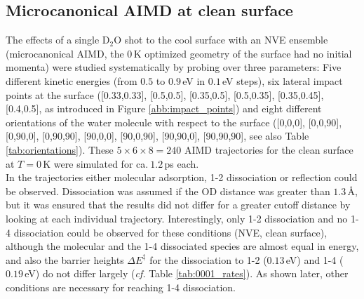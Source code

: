 \documentclass[11pt,DIV=13,BCOR=5mm,a4paper,headinclude]{scrbook}
\begin{document}
\subsection{Microcanonical AIMD at clean surface}\label{sec:mic_clean}
The effects of a single D$_2$O shot to the cool surface with an NVE ensemble (microcanonical AIMD, the $0\,$K optimized geometry of the surface had no initial momenta) were studied systematically by probing over three parameters: Five different kinetic energies (from $0.5$ to $0.9\,$eV in $0.1\,$eV steps), six lateral impact points at the surface ([0.33,0.33], [0.5,0.5], [0.35,0.5], [0.5,0.35], [0.35,0.45], [0.4,0.5], as introduced in Figure \ref{abb:impact_points}) and eight different orientations of the water molecule with respect to the surface ([0,0,0], [0,0,90], [0,90,0], [0,90,90], [90,0,0], [90,0,90], [90,90,0], [90,90,90], see also Table \ref{tab:orientations}).
These $5\times 6\times 8=240$ AIMD trajectories for the clean surface at $T=0\,$K were simulated for ca.$~1.2\,$ps each.
\\
In the trajectories  either molecular adsorption, 1-2 dissociation or reflection could be observed.
Dissociation was assumed if the OD distance was greater than $1.3\,$\AA{}, but it was ensured that the results did not differ for a greater cutoff distance by looking at each individual trajectory.
Interestingly, only 1-2 dissociation and no 1-4 dissociation could be observed for these conditions (NVE, clean surface), although the molecular and the 1-4 dissociated species are almost equal in energy, and also the barrier heights $\Delta E^\ddagger$ for the dissociation to 1-2 ($0.13\,$eV) and 1-4 ($0.19\,$eV) do not differ largely (\textit{cf.} Table \ref{tab:0001_rates}).
As shown later, other conditions are necessary for reaching 1-4 dissociation.
\\
\end{document}
